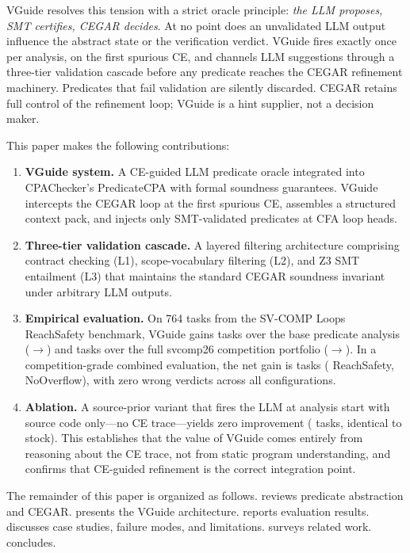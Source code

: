 VGuide resolves this tension with a strict oracle principle: \emph{the LLM proposes,
SMT certifies, CEGAR decides}. At no point does an unvalidated LLM output influence
the abstract state or the verification verdict. VGuide fires exactly once per analysis,
on the first spurious CE, and channels LLM suggestions through a three-tier validation
cascade before any predicate reaches the CEGAR refinement machinery. Predicates that
fail validation are silently discarded. CEGAR retains full control of the refinement
loop; VGuide is a hint supplier, not a decision maker.

This paper makes the following contributions:
\begin{enumerate}
  \item \textbf{VGuide system.} A CE-guided LLM predicate oracle integrated into
        CPAChecker's PredicateCPA with formal soundness guarantees. VGuide intercepts
        the CEGAR loop at the first spurious CE, assembles a structured context pack,
        and injects only SMT-validated predicates at CFA loop heads.
  \item \textbf{Three-tier validation cascade.} A layered filtering architecture
        comprising contract checking (L1), scope-vocabulary filtering (L2), and Z3
        SMT entailment (L3) that maintains the standard CEGAR soundness invariant
        under arbitrary LLM outputs.
  \item \textbf{Empirical evaluation.} On 764 tasks from the SV-COMP Loops
        ReachSafety benchmark, VGuide gains \LoopsDelta{} tasks over the base
        predicate analysis (\LoopsStock{}$\to$\LoopsVGuide{}) and \PortfolioLoopsDelta{}
        tasks over the full svcomp26 competition portfolio
        (\PortfolioLoopsStock{}$\to$\PortfolioLoopsVGuide{}). In a
        competition-grade combined evaluation, the net gain is \CompTotalDelta{} tasks
        (\CompReachDelta{} ReachSafety, \CompOvfDelta{} NoOverflow), with zero wrong
        verdicts across all configurations.
  \item \textbf{Ablation.} A source-prior variant that fires the LLM at analysis
        start with source code only---no CE trace---yields zero improvement
        (\AblationSourcePrior{} tasks, identical to stock). This establishes that the
        value of VGuide comes entirely from reasoning about the CE trace, not from
        static program understanding, and confirms that CE-guided refinement is the
        correct integration point.
\end{enumerate}

The remainder of this paper is organized as follows.  reviews
predicate abstraction and CEGAR.  presents the VGuide architecture.
 reports evaluation results.  discusses
case studies, failure modes, and limitations.  surveys related
work.  concludes.
